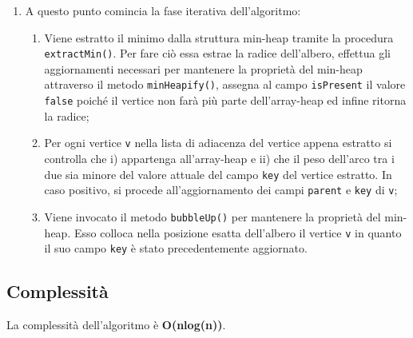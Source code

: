 \begin{itemize}
\begin{enumerate}
		\item A questo punto comincia la fase iterativa dell'algoritmo:
		\begin{enumerate}
			\item Viene estratto il minimo dalla struttura min-heap tramite la procedura \texttt{extractMin()}. Per fare ciò essa estrae la radice dell'albero, effettua gli aggiornamenti necessari per mantenere la proprietà del min-heap attraverso il metodo \texttt{minHeapify()}, assegna al campo \texttt{isPresent} il valore \texttt{false} poiché il vertice non farà più parte dell'array-heap ed infine ritorna la radice;
			\item Per ogni vertice \texttt{v} nella lista di adiacenza del vertice appena estratto si controlla che i) appartenga all'array-heap e ii) che il peso dell'arco tra i due sia minore del valore attuale del campo \texttt{key} del vertice estratto. In caso positivo, si procede all'aggiornamento dei campi \texttt{parent} e \texttt{key} di \texttt{v};
			\item Viene invocato il metodo \texttt{bubbleUp()} per mantenere la proprietà del min-heap. Esso colloca nella posizione esatta dell'albero il vertice \texttt{v} in quanto il suo campo \texttt{key} è stato precedentemente aggiornato.
		\end{enumerate} 
	\end{enumerate}
\end{itemize}

\subsection{Complessità}
La complessità dell'algoritmo è \textbf{O(nlog(n))}.
\pagebreak
